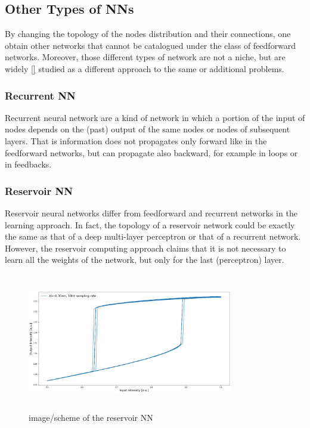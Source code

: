 \subsection{Other Types of NNs}
\label{ssec:Other_Types_of_NNs}
By changing the topology of the nodes distribution and their connections, one obtain other networks that cannot be catalogued under the class of feedforward networks.
Moreover, those different types of network are not a niche, but are widely \ref{} studied as a different approach to the same or additional problems.

\subsubsection{Recurrent NN}
\label{sssec:Recurrent_NN}
Recurrent neural network are a kind of network in which a portion of the input of nodes depends on the (past) output of the same nodes or nodes of subsequent layers.
That is information does not propagates only forward like in the feedforward networks, but can propagate also backward, for example in loops or in feedbacks.

\begin{figure}[ht]
	\centering
	
	\caption{%
		}
	\label{fig:RecurrentNN}
\end{figure}

\subsubsection{Reservoir NN}
\label{sssec:Reservoir_NN}
Reservoir neural networks differ from feedforward and recurrent networks in the learning approach.
In fact, the topology of a reservoir network could be exactly the same as that of a deep multi-layer perceptron or that of a recurrent network.
However, the reservoir computing approach claims that it is not necessary to learn all the weights of the network, but only for the last (perceptron) layer.

\begin{figure}[ht]
	\centering
	\includegraphics[draft,width=9cm,height=6cm]{figures/foo.png}
	\caption{image/scheme of the reservoir NN}
	\label{fig:reservoirNN}
\end{figure}

